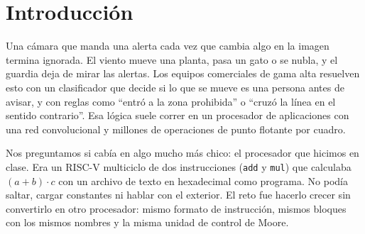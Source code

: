 \documentclass[conference,letterpaper,10pt]{IEEEtran}
\newcommand{\sig}[1]{{\small\texttt{#1}}}
\begin{document}
\begin{otherlanguage}{english}
\renewcommand{\abstractname}{Abstract}
\begin{abstract}
Low-cost security cameras raise an alarm whenever something moves, and most of the time it is a shadow, a lighting change or
an animal. We took the multicycle RISC-V processor built in class, which only computed $(a+b)\cdot c$, and extended it in stages
until it ran a complete perimeter-surveillance program on a DE10-Lite board with an OV7670 camera. The processor keeps the
instruction format, the blocks and the Moore control unit of the original design; what grows is the ALU, which now holds three
tables of eight operations selected by the opcode, without widening \texttt{funct3}. With 49 instructions and 11 states it runs a
1,470-instruction program that labels the silhouettes produced by the hardware vision pipeline, classifies them with a binary
neural network of 512 inputs and 64 neurons, and applies zone and line-crossing rules only to confirmed people. The \texttt{xnor}
and \texttt{cpop} instructions make the network 2.46 times faster, and the worst frame with a person uses 31\% of the time
between camera frames. The network is 91.6\% accurate on 1,800 silhouettes using integer arithmetic. Seven self-checking
testbenches pass 625 of 625 checks, and the design uses 9,292 logic elements and meets timing at 33.57~MHz for a 25~MHz clock.
\end{abstract}
\end{otherlanguage}

\section{Introducción}

Una cámara que manda una alerta cada vez que cambia algo en la imagen termina ignorada. El viento mueve una planta, pasa un gato
o se nubla, y el guardia deja de mirar las alertas. Los equipos comerciales de gama alta resuelven esto con un clasificador
que decide si lo que se mueve es una persona antes de avisar, y con reglas como ``entró a la zona prohibida'' o ``cruzó la línea
en el sentido contrario''. Esa lógica suele correr en un procesador de aplicaciones con una red convolucional y millones de
operaciones de punto flotante por cuadro.

Nos preguntamos si cabía en algo mucho más chico: el procesador que hicimos en clase. Era un RISC-V multiciclo de dos
instrucciones (\sig{add} y \sig{mul}) que calculaba $(a+b)\cdot c$ con un archivo de texto en hexadecimal como programa. No podía
saltar, cargar constantes ni hablar con el exterior. El reto fue hacerlo crecer sin convertirlo en otro procesador: mismo
formato de instrucción, mismos bloques con los mismos nombres y la misma unidad de control de Moore.
\end{document}
